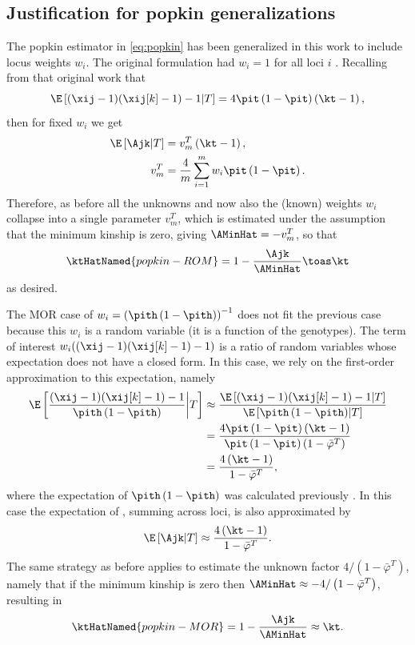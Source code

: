 \documentclass[11pt]{article}
\begin{document}
\begin{appendices}
  \appendix

  \appendixpage
  
  \section{Justification for popkin generalizations}

  \label{sec:popkin_w_justif}

  The popkin estimator in \cref{eq:popkin} has been generalized in this work to include locus weights $w_i$.
  The original formulation had $w_i=1$ for all loci $i$ \citep{ochoa_estimating_2021}.
  Recalling from that original work that
  $$
  \E \left[ (\xij-1)(\xij[k]-1) - 1 \middle| T \right]
  =
  4 \pit \left( 1 - \pit \right) \left( \kt - 1 \right),
  $$
  then for fixed $w_i$ we get
  \begin{align*}
    \E \left[ \Ajk \middle| T \right]
    &=
      v_m^T \left( \kt - 1 \right)
      , \\
    v_m^T
    &=
      \frac{4}{m} \sum_{i=1}^m w_i \pit \left( 1 - \pit \right)
      .
  \end{align*}
  Therefore, as before all the unknowns \pit and now also the (known) weights $w_i$ collapse into a single parameter $v_m^T$, which is estimated under the assumption that the minimum kinship is zero, giving $\AMinHat = -v_m^T$, so that
  $$
  \ktHatNamed{popkin-ROM}
  =
  1 - \frac{\Ajk}{\AMinHat}
  \toas
  \kt
  $$
  as desired.

  The MOR case of $w_i = \left( \pith \left( 1 - \pith \right) \right)^{-1}$ does not fit the previous case because this $w_i$ is a random variable (it is a function of the genotypes).
  The term of interest $w_i ( (\xij-1)(\xij[k]-1) - 1 )$ is a ratio of random variables whose expectation does not have a closed form.
  In this case, we rely on the first-order approximation to this expectation, namely
  \begin{align*}
    \E \left[ \frac{ (\xij-1)(\xij[k]-1) - 1 }{ \pith \left( 1 - \pith \right) } \middle| T \right]
    &\approx
      \frac{ \E \left[ (\xij-1)(\xij[k]-1) - 1 \middle| T \right] }{ \E \left[ \pith \left( 1 - \pith \right) \middle| T \right] }
    \\
    &=
      \frac{ 4 \pit \left( 1 - \pit \right) \left( \kt - 1 \right) }{ \pit \left( 1 - \pit \right) \left( 1 - \bar{\varphi}^T \right) }
    \\
    &=
      \frac{ 4 \left( \kt - 1 \right) }{ 1 - \bar{\varphi}^T }
  ,
  \end{align*}
  where the expectation of $\pith \left( 1 - \pith \right)$ was calculated previously \citep{ochoa_estimating_2021}.
  In this case the expectation of \Ajk, summing across loci, is also approximated by
  $$
  \E \left[ \Ajk \middle| T \right]
  \approx
  \frac{ 4 \left( \kt - 1 \right) }{ 1 - \bar{\varphi}^T }
  .
  $$
  The same strategy as before applies to estimate the unknown factor $4 / \left( 1- \bar{\varphi}^T \right)$, namely that if the minimum kinship is zero then $\AMinHat \approx - 4 / \left( 1- \bar{\varphi}^T \right)$, resulting in
  $$
  \ktHatNamed{popkin-MOR}
  =
  1 - \frac{\Ajk}{\AMinHat}
  \approx
  \kt
  .
  $$


\end{appendices}
\end{document}

